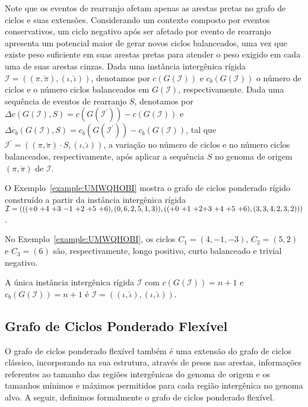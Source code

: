 Note que os eventos de rearranjo afetam apenas as arestas pretas no grafo de ciclos e suas extensões. Considerando um contexto composto por eventos conservativos, um ciclo negativo após ser afetado por evento de rearranjo apresenta um potencial maior de gerar novos ciclos balanceados, uma vez que existe peso suficiente em suas arestas pretas para atender o peso exigido em cada uma de suas arestas cinzas. Dada uma instância intergênica rígida $\mathcal{I} = ((\pi,\breve\pi),(\iota,\breve\iota))$, denotamos por $c(G(\mathcal{I}))$ e $c_b(G(\mathcal{I}))$ o número de ciclos e o número ciclos balanceados em $G(\mathcal{I})$, respectivamente. Dada uma sequência de eventos de rearranjo $S$, denotamos por $\Delta c(G(\mathcal{I}), S) = c(G(\mathcal{I^{\prime}})) - c(G(\mathcal{I}))$ e $\Delta c_b(G(\mathcal{I}), S) = c_b(G(\mathcal{I^{\prime}})) - c_b(G(\mathcal{I}))$, tal que $\mathcal{I^{\prime}} = ((\pi,\breve\pi) \cdot S,(\iota,\breve\iota))$, a variação no número de ciclos e no número ciclos balanceados, respectivamente, após aplicar a sequência $S$ no genoma de origem $(\pi,\breve\pi)$ de $\mathcal{I}$.

O Exemplo~\ref{example:UMWQHOBI} mostra o grafo de ciclos ponderado rígido construído a partir da instância intergênica rígida $\mathcal{I} = ((({+0}~{+4}~{+3}~{-1}~{+2}~{+5}~{+6}),(0,6,2,5,1,3)),(({+0}~{+1}~{+2}\break{+3}~{+4}~{+5}~{+6}),(3,3,4,2,3,2)))$.



No Exemplo~\ref{example:UMWQHOBI}, os ciclos $C_1=(4,-1,-3)$, $C_2 = (5,2)$ e $C_3 = (6)$ são, respectivamente, longo positivo, curto balanceado e trivial negativo.

\begin{remark}\label{remark:WVLFPRDL}
  A única instância intergênica rígida $\mathcal{I}$ com $c(G(\mathcal{I})) = n + 1$ e $c_b(G(\mathcal{I})) = n + 1$ é $\mathcal{I} = ((\iota,\breve\iota),(\iota,\breve\iota))$.
\end{remark}

\subsection{Grafo de Ciclos Ponderado Flexível}\label{subsection:HUWEVNDS}

O grafo de ciclos ponderado flexível também é uma extensão do grafo de ciclos clássico, incorporando na sua estrutura, através de pesos nas arestas, informações referentes ao tamanho das regiões intergênicas do genoma de origem e os tamanhos mínimos e máximos permitidos para cada região intergênica no genoma alvo. A seguir, definimos formalmente o grafo de ciclos ponderado flexível.

